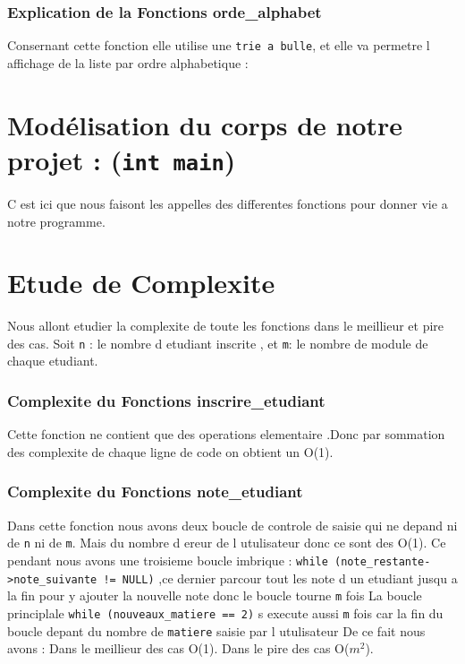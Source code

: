 \documentclass[12pt,a4paper]{article}
\begin{document}


\subsubsection{Explication de la Fonctions orde\_alphabet}
Consernant cette fonction elle utilise une \texttt{trie a bulle}, et elle va permetre l affichage de la liste
par ordre alphabetique :








\section{Modélisation du corps de notre projet : (\texttt{int main})}
C est ici que nous faisont les appelles des differentes fonctions pour donner vie a notre programme.










\section{Etude de Complexite }
Nous allont etudier la complexite de toute les fonctions dans le meillieur et pire des cas.
Soit \texttt{n} : le nombre d etudiant inscrite , et \texttt{m}: le nombre de module de chaque etudiant.





\subsubsection{Complexite du Fonctions inscrire\_etudiant}
Cette fonction ne contient que des operations elementaire .Donc par sommation des complexite de chaque ligne de code on obtient un O(1).





\subsubsection{Complexite du Fonctions note\_etudiant}
Dans cette fonction nous avons deux boucle de controle de saisie qui ne depand ni de \texttt{n} ni de \texttt{m}.
Mais du nombre d ereur de l utulisateur donc ce sont des O(1).
Ce pendant nous avons une troisieme boucle imbrique : \texttt{while (note\_restante->note\_suivante != NULL)} ,ce dernier parcour tout les note d un etudiant
jusqu a la fin pour y ajouter la nouvelle note donc le boucle tourne \texttt{m} fois 
La boucle principlale \texttt{while (nouveaux\_matiere == 2)} s execute aussi \texttt{m} fois car la fin du boucle 
depant du nombre de \texttt{matiere} saisie par l utulisateur 
De ce fait nous avons :
Dans le meillieur des cas O(1).
Dans le pire des cas O($m^2$).
\end{document}
